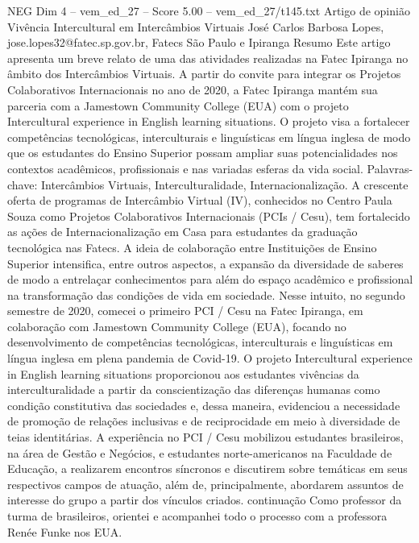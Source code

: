 \begin{textsample}{NEG Dim 4 – vem\_ed\_27 – Score 5.00 – vem\_ed\_27/t145.txt}  \label{ex:f4_neg_150}
Artigo de opinião Vivência Intercultural em Intercâmbios Virtuais José Carlos Barbosa Lopes, jose.lopes32@fatec.sp.gov.br, Fatecs São Paulo e Ipiranga Resumo Este artigo apresenta um breve relato de uma das atividades realizadas na Fatec Ipiranga no âmbito dos Intercâmbios Virtuais.
A partir do convite para integrar os Projetos Colaborativos Internacionais no ano de 2020, a Fatec Ipiranga mantém sua parceria com a Jamestown Community College (EUA) com o projeto Intercultural experience in English learning situations.
O projeto visa a fortalecer competências tecnológicas, interculturais e linguísticas em língua inglesa de modo que os estudantes do Ensino Superior possam ampliar suas potencialidades nos contextos acadêmicos, profissionais e nas variadas esferas da vida social.
Palavras-chave: Intercâmbios Virtuais, Interculturalidade, Internacionalização.
A crescente oferta de programas de Intercâmbio Virtual (IV), conhecidos no Centro Paula Souza como Projetos Colaborativos Internacionais (PCIs / Cesu), tem fortalecido as ações de Internacionalização em Casa para estudantes da graduação tecnológica nas Fatecs.
A ideia de colaboração entre Instituições de Ensino Superior intensifica, entre outros aspectos, a expansão da diversidade de saberes de modo a entrelaçar conhecimentos para além do espaço acadêmico e profissional na transformação das condições de vida em sociedade.
Nesse intuito, no segundo semestre de 2020, comecei o primeiro PCI / Cesu na Fatec Ipiranga, em colaboração com Jamestown Community College (EUA), focando no desenvolvimento de competências tecnológicas, interculturais e linguísticas em língua inglesa em plena pandemia de Covid-19.
O projeto Intercultural experience in English learning situations proporcionou aos estudantes vivências da interculturalidade a partir da conscientização das diferenças humanas como condição constitutiva das sociedades e, dessa maneira, evidenciou a necessidade de promoção de relações inclusivas e de reciprocidade em meio à diversidade de teias identitárias.
A experiência no PCI / Cesu mobilizou estudantes brasileiros, na área de Gestão e Negócios, e estudantes norte-americanos na Faculdade de Educação, a realizarem encontros síncronos e discutirem sobre temáticas em seus respectivos campos de atuação, além de, principalmente, abordarem assuntos de interesse do grupo a partir dos vínculos criados. continuação Como professor da turma de brasileiros, orientei e acompanhei todo o processo com a professora Renée Funke nos EUA.

\end{textsample}

